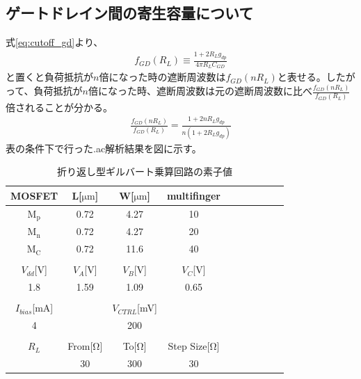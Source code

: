 \documentclass[twocolumn]{jsarticle}
\begin{document}
\subsection{ゲートドレイン間の寄生容量について}
    式\eqref{eq:cutoff_gd}より、
    \begin{align*}
        f_{GD}(R_{L})\equiv\frac{1+2R_{L}g_{dp}}{4\pi R_{L}C_{GD}}
    \end{align*}
    と置くと負荷抵抗が$n$倍になった時の遮断周波数は$f_{GD}(nR_{L})$と表せる。したがって、負荷抵抗が$n$倍になった時、遮断周波数は元の遮断周波数に比べ$\frac{f_{GD}(nR_{L})}{f_{GD}(R_{L})}$倍されることが分かる。
    \begin{align*}
        \frac{f_{GD}(nR_{L})}{f_{GD}(R_{L})}=\frac{1+2nR_{L}g_{dp}}{n(1+2R_{L}g_{dp})}
    \end{align*}
    表の条件下で行った.ac解析結果を図に示す。

    \begin{table}[h]
        \caption{折り返し型ギルバート乗算回路の素子値}
        \label{table:sim_gd}
        \centering
        \begin{tabular}{cccccccccc}
            MOSFET & L[$\mathrm{\mu m}$] & W[$\mathrm{\mu m}$] & multifinger\\
            \hline \hline
            $\mathrm{M_{p}}$ & 0.72 & 4.27 & 10 \\
            $\mathrm{M_{n}}$ & 0.72 & 4.27 & 20 \\
            $\mathrm{M_{C}}$ & 0.72 & 11.6 & 40 \\
            &&&\\
            $V_{dd}$[V] & $V_{A}$[V] & $V_{B}$[V] & $V_{C}$[V]\\
            \hline\hline
            1.8 & 1.59 & 1.09 & 0.65 \\
            &&&\\
            $I_{bias}$[mA] & & $V_{CTRL}$[mV] & \\
            \hline\hline
            4 & & 200 & \\
            &&&\\
            $R_{L}$ & From[$\mathrm{\Omega}$] & To[$\mathrm{\Omega}$] & Step Size[$\mathrm{\Omega}$]\\
            \hline\hline
            & 30 & 300 & 30
        \end{tabular}
    \end{table}
\end{document}
